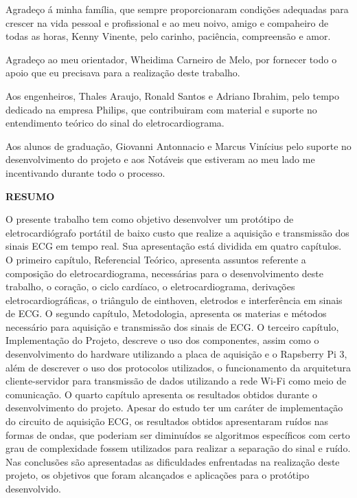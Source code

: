 \documentclass[12pt, a4paper]{article}
\begin{document}
\hspace*{0.8cm} Agradeço á minha família, que sempre proporcionaram condições adequadas para crescer na vida pessoal e profissional e ao meu noivo, amigo e compaheiro de todas as horas, Kenny Vinente, pelo carinho, paciência, compreensão e amor.

\hspace*{0.8cm} Agradeço ao meu orientador, Wheidima Carneiro de Melo, por fornecer todo o apoio que eu precisava para a realização deste trabalho.


\hspace*{0.8cm}Aos engenheiros, Thales Araujo, Ronald Santos e Adriano Ibrahim, pelo tempo dedicado na empresa Philips, que contribuiram com material e suporte no entendimento teórico do sinal do eletrocardiograma.


\hspace*{0.8cm}Aos alunos de graduação, Giovanni Antonnacio e Marcus Vinícius pelo suporte no desenvolvimento do projeto e aos Notáveis que estiveram ao meu lado me incentivando durante todo o processo.




\newpage

\thispagestyle{empty}
\vspace*{4cm}
{\begin{center}\textbf{\normalsize RESUMO}\vspace{36pt}\end{center}}
O presente trabalho tem como objetivo desenvolver um protótipo de eletrocardiógrafo portátil de baixo custo que realize a aquisição e transmissão dos sinais ECG em tempo real. Sua apresentação está dividida em quatro capítulos. O primeiro capítulo, Referencial Teórico, apresenta assuntos referente a composição do eletrocardiograma, necessárias para o desenvolvimento deste trabalho, o coração, o ciclo cardíaco, o eletrocardiograma, derivações eletrocardiográficas, o triângulo de einthoven, eletrodos e interferência em sinais de ECG. O segundo capítulo, Metodologia, apresenta os materias e métodos necessário para aquisição e transmissão dos sinais de ECG. O terceiro capítulo, Implementação do Projeto, descreve o uso dos componentes, assim como o desenvolvimento do hardware utilizando a placa de aquisição e o Rapsberry Pi 3, além de descrever o uso dos protocolos utilizados, o funcionamento da arquitetura cliente-servidor para transmissão de dados utilizando a rede Wi-Fi como meio de comunicação. O quarto capítulo apresenta os resultados obtidos durante o desenvolvimento do projeto. Apesar do estudo ter um caráter de implementação do circuito de aquisição ECG, os resultados obtidos apresentaram ruídos nas formas de ondas, que poderiam ser diminuídos se algoritmos específicos com certo grau de complexidade fossem utilizados para realizar a separação do sinal e ruído. Nas conclusões são apresentadas as dificuldades enfrentadas na realização deste projeto, os objetivos que foram alcançados e aplicações para o protótipo desenvolvido.
\end{document}
